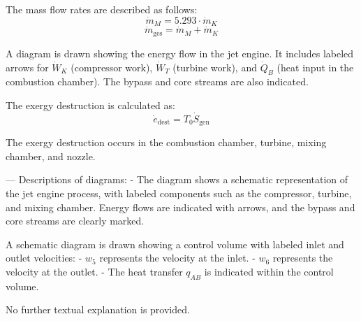The mass flow rates are described as follows:  
\[
\dot{m}_M = 5.293 \cdot \dot{m}_K
\]  
\[
\dot{m}_{\text{ges}} = \dot{m}_M + \dot{m}_K
\]  

A diagram is drawn showing the energy flow in the jet engine. It includes labeled arrows for \( \dot{W}_K \) (compressor work), \( \dot{W}_T \) (turbine work), and \( \dot{Q}_B \) (heat input in the combustion chamber). The bypass and core streams are also indicated.  

The exergy destruction is calculated as:  
\[
\dot{e}_{\text{dest}} = T_0 \dot{S}_{\text{gen}}
\]  

The exergy destruction occurs in the combustion chamber, turbine, mixing chamber, and nozzle.  

---  
Descriptions of diagrams:  
- The diagram shows a schematic representation of the jet engine process, with labeled components such as the compressor, turbine, and mixing chamber. Energy flows are indicated with arrows, and the bypass and core streams are clearly marked.

A schematic diagram is drawn showing a control volume with labeled inlet and outlet velocities:  
- \( w_5 \) represents the velocity at the inlet.  
- \( w_6 \) represents the velocity at the outlet.  
- The heat transfer \( q_{AB} \) is indicated within the control volume.  

No further textual explanation is provided.